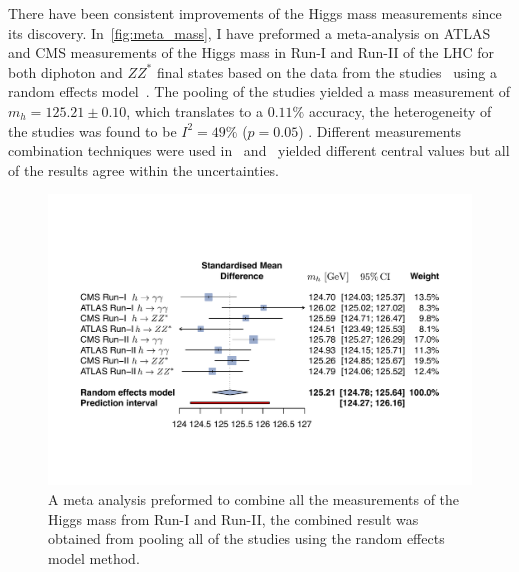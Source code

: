 There have been consistent improvements of the Higgs mass measurements since its discovery. In~\autoref{fig:meta_mass}, I have preformed a meta-analysis on ATLAS and CMS measurements of the Higgs mass in Run-I and Run-II of the LHC for both diphoton and $ZZ^*$ final states based on the data from the studies~\cite{ATLAS:2015yey,ATLAS:2018tdk,CMS:2017dib,CMS:2020xrn} using a random effects model~\cite{aronow_miller_2019}. The pooling of the studies yielded a mass measurement of $ m_h = 125.21 \pm 0.10$, which translates to a $0.11\%$ accuracy, the heterogeneity of the studies was found to be $I^2 =49\%$ ($p=0.05$) . Different measurements combination techniques were used in~\cite{CMS:2020xrn} and~\cite{Zyla:2020zbs} yielded different central values but all of the results agree within the uncertainties. 
\begin{figure}[h!]
	\begin{center}
		\includegraphics[width=1.\textwidth]{figures/foreest_pllot_higgs_mass}
		\caption{A meta analysis preformed to combine all the measurements of the Higgs mass from Run-I and Run-II, the combined result was obtained from pooling all of the studies using the random effects model method.\label{fig:meta_mass} }
	\end{center}
\end{figure}
